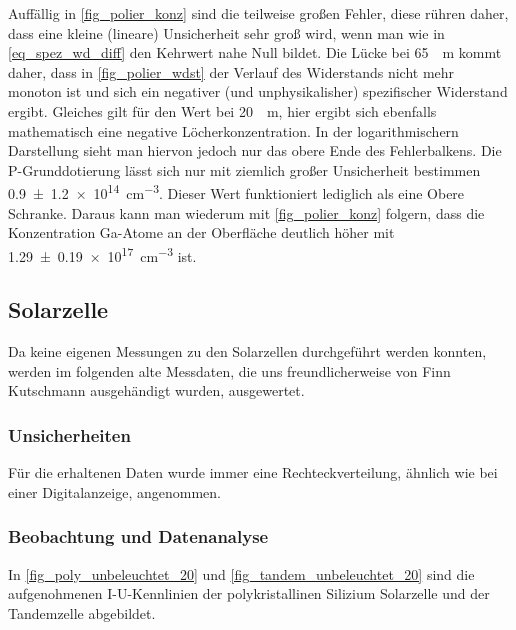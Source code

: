 \documentclass[
	a4paper,
	12pt,
	pagesize,
	ngerman
]{scrartcl}
\begin{document}
	Auffällig in \cref{fig_polier_konz} sind die teilweise großen Fehler, diese rühren daher, dass eine kleine (lineare) Unsicherheit sehr groß wird, wenn man wie in \cref{eq_spez_wd_diff} den Kehrwert nahe Null bildet.
	Die Lücke bei \SI{65}{\mu m} kommt daher, dass in \cref{fig_polier_wdst} der Verlauf des Widerstands nicht mehr monoton ist und sich ein negativer (und unphysikalisher) spezifischer Widerstand ergibt.
	Gleiches gilt für den Wert bei \SI{20}{\mu m}, hier ergibt sich ebenfalls mathematisch eine negative Löcherkonzentration.
	In der logarithmischern Darstellung sieht man hiervon jedoch nur das obere Ende des Fehlerbalkens.
	Die P-Grunddotierung lässt sich nur mit ziemlich großer Unsicherheit bestimmen \SI{0.9+-1.2e14}{cm^{-3}}.
	Dieser Wert funktioniert lediglich als eine Obere Schranke.
	Daraus kann man wiederum mit \cref{fig_polier_konz} folgern, dass die Konzentration Ga-Atome an der Oberfläche deutlich höher mit \SI{1.29+-0.19e17}{cm^{-3}} ist.

	\subsection{Solarzelle}

	Da keine eigenen Messungen zu den Solarzellen durchgeführt werden konnten, werden im folgenden alte Messdaten, die uns freundlicherweise von Finn Kutschmann ausgehändigt wurden, ausgewertet.
	\subsubsection{Unsicherheiten}
	Für die erhaltenen Daten wurde immer eine Rechteckverteilung, ähnlich wie bei einer Digitalanzeige, angenommen.
	\subsubsection{Beobachtung und Datenanalyse}

	In \cref{fig_poly_unbeleuchtet_20} und \cref{fig_tandem_unbeleuchtet_20} sind die aufgenohmenen I-U-Kennlinien der polykristallinen Silizium Solarzelle und der Tandemzelle abgebildet.
\end{document}
